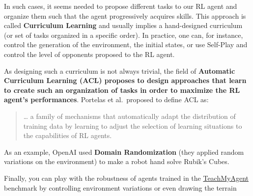 \documentclass[11pt,a4paper]{article}
\begin{document}


In such cases, it seems needed to propose different tasks to our RL agent and organize them such that the agent progressively acquires skills. This approach is called \textbf{Curriculum Learning} and usually implies a hand-designed curriculum (or set of tasks organized in a specific order). In practice, one can, for instance, control the generation of the environment, the initial states, or use Self-Play and control the level of opponents proposed to the RL agent.

As designing such a curriculum is not always trivial, the field of \textbf{Automatic Curriculum Learning (ACL) proposes to design approaches that learn to create such an organization of tasks in order to maximize the RL agent's performances}. Portelas et al.~proposed to define ACL as:

\begin{quote}
\ldots{} a family of mechanisms that automatically adapt the distribution of training data by learning to adjust the selection of learning situations to the capabilities of RL agents.
\end{quote}

As an example, OpenAI used \textbf{Domain Randomization} (they applied random variations on the environment) to make a robot hand solve Rubik's Cubes.


Finally, you can play with the robustness of agents trained in the \href{https://huggingface.co/spaces/flowers-team/Interactive_DeepRL_Demo}{TeachMyAgent} benchmark by controlling environment variations or even drawing the terrain
\end{document}
